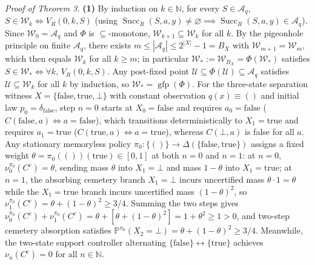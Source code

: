 \documentclass[11pt,a4paper]{article}
\begin{document}
\emph{Proof of Theorem 3.} \textbf{(1)} By induction on
\(k \in \mathbb{N}\), for every \(S \in \mathcal{A}_q\),
\(S \in \mathcal{W}_k \iff V_R(0, k, S)\) (using
\(\operatorname{Succ}_R(S,a,y) \neq \varnothing \implies \operatorname{Succ}_R(S,a,y) \in \mathcal{A}_q\)).
Since \(\mathcal{W}_0 = \mathcal{A}_q\) and \(\Phi\) is
\(\subseteq\)-monotone, \(\mathcal{W}_{k+1} \subseteq \mathcal{W}_k\)
for all \(k\). By the pigeonhole principle on finite \(\mathcal{A}_q\),
there exists \(m \le |\mathcal{A}_q| \le 2^{|X|} - 1 = B_X\) with
\(\mathcal{W}_{m+1} = \mathcal{W}_m\), which then equals
\(\mathcal{W}_k\) for all \(k \ge m\); in particular
\(\mathcal{W}_* := \mathcal{W}_{B_X} = \Phi(\mathcal{W}_*)\) satisfies
\(S \in \mathcal{W}_* \iff \forall k,\, V_R(0, k, S)\). Any post-fixed
point
\(\mathcal{U} \subseteq \Phi(\mathcal{U}) \subseteq \mathcal{A}_q\)
satisfies \(\mathcal{U} \subseteq \mathcal{W}_k\) for all \(k\) by
induction, so \(\mathcal{W}_* = \operatorname{gfp}(\Phi)\). For the
three-state separation witness
\(X = \{\mathrm{false}, \mathrm{true}, \bot\}\) with constant
observation \(q(x) \equiv ()\) and initial law
\(p_0 = \delta_{\mathrm{false}}\), step \(n=0\) starts at
\(X_0 = \mathrm{false}\) and requires \(a_0 = \mathrm{false}\)
(\(C(\mathrm{false}, a) \iff a = \mathrm{false}\)), which transitions
deterministically to \(X_1 = \mathrm{true}\) and requires
\(a_1 = \mathrm{true}\)
(\(C(\mathrm{true}, a) \iff a = \mathrm{true}\)), whereas \(C(\bot, a)\)
is false for all \(a\). Any stationary memoryless policy
\(\pi_0: \{()\} \to \Delta(\{\mathrm{false}, \mathrm{true}\})\) assigns
a fixed weight \(\theta = \pi_0(())(\mathrm{true}) \in [0,1]\) at both
\(n=0\) and \(n=1\): at \(n=0\), \(\nu_0^{\pi_0}(C^c) = \theta\),
sending mass \(\theta\) into \(X_1 = \bot\) and mass \(1-\theta\) into
\(X_1 = \mathrm{true}\); at \(n=1\), the absorbing cemetery branch
\(X_1 = \bot\) incurs uncertified mass \(\theta \cdot 1 = \theta\) while
the \(X_1 = \mathrm{true}\) branch incurs uncertified mass
\((1-\theta)^2\), so
\(\nu_1^{\pi_0}(C^c) = \theta + (1-\theta)^2 \ge 3/4\). Summing the two
steps gives
\(\nu_0^{\pi_0}(C^c) + \nu_1^{\pi_0}(C^c) = \theta + [\theta + (1-\theta)^2] = 1 + \theta^2 \ge 1 > 0\),
and two-step cemetery absorption satisfies
\(\mathbb{P}^{\pi_0}(X_2 = \bot) = \theta + (1-\theta)^2 \ge 3/4\).
Meanwhile, the two-state support controller alternating
\(\{\mathrm{false}\} \leftrightarrow \{\mathrm{true}\}\) achieves
\(\nu_n(C^c) = 0\) for all \(n \in \mathbb{N}\).
\end{document}
